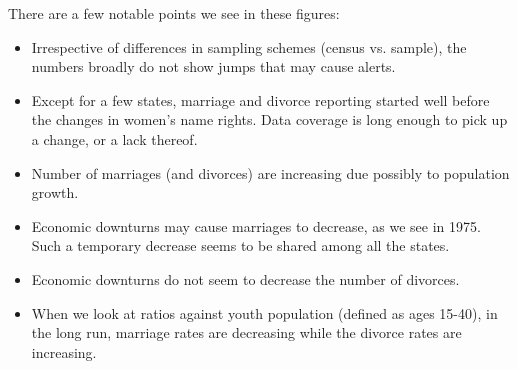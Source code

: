 \vspace{2ex}

\vspace{4ex}

\vspace{4ex}
There are a few notable points we see in these figures:
\begin{itemize}
\vspace{1.0ex}\setlength{\itemsep}{1.0ex}\setlength{\baselineskip}{12pt}
\item	Irrespective of differences in sampling schemes (census vs. sample), the numbers broadly do not show jumps that may cause alerts. 
\item	Except for a few states, marriage and divorce reporting started well before the changes in women's name rights. Data coverage is long enough to pick up a change, or a lack thereof.
\item	Number of marriages (and divorces) are increasing due possibly to population growth.
\item	Economic downturns may cause marriages to decrease, as we see in 1975. Such a temporary decrease seems to be shared among all the states. 
\item	Economic downturns do not seem to decrease the number of divorces.
\item	When we look at ratios against youth population (defined as ages 15-40),  in the long run, marriage rates are decreasing while the divorce rates are increasing.
\end{itemize}




